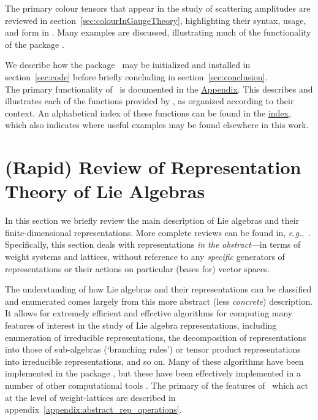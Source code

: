 \documentclass[12pt,a4paper]{article}\let\ifpdf\relax
\begin{document}
The primary colour tensors that appear in the study of scattering amplitudes are reviewed in \mbox{section~\ref{sec:colourInGaugeTheory}}, highlighting their syntax, usage, and form in \rpackage. Many examples are discussed, illustrating much of the functionality of the package \rpackage. 

We describe how the package \rpackage~may be initialized and installed in \mbox{section~\ref{sec:code}} before briefly concluding in \mbox{section~\ref{sec:conclusion}}.\\[-10pt]

The primary functionality of \rpackage~is documented in the \hyperlink{context_organization_of_appendix}{Appendix}. This describes and illustrates each of the functions provided by \rpackage, as organized according to their context. An alphabetical index of these functions can be found in the \hyperlink{index}{index}, which also indicates where useful examples may be found elsewhere in this work.





\newpage

\section{(Rapid) Review of Representation Theory of Lie Algebras}\label{review_section}\vspace{-4pt}

In this section we briefly review the main description of Lie algebras and their finite-dimensional representations. More complete reviews can be found in, \emph{e.g.},~\mbox{\cite{Slansky:1981yr,Cornwell:1997ke,DiFrancesco:1997nk,birdtracks,hamermesh2012group,fulton2013,georgi2018lie,Bourjaily:2025hvq}.} Specifically, this section deals with representations \emph{in the abstract}---in terms of weight systems and lattices, without reference to any \emph{specific} generators of representations or their actions on particular (bases for) vector spaces. 

The understanding of how Lie algebras and their representations can be classified and enumerated comes largely from this more abstract (less \emph{concrete}) description. It allows for extremely efficient and effective algorithms for computing many features of interest in the study of Lie algebra representations, including enumeration of irreducible representations, the decomposition of representations into those of sub-algebras (`branching rules') or tensor product representations into irreducible representations, and so on. Many of these algorithms have been implemented in the package \rpackage, but these have been effectively implemented in a number of other computational tools \cite{Feger:2019tvk,sage,magma}. The primary of the features of \rpackage~which act at the level of weight-lattices are described in \mbox{appendix~\ref{appendix:abstract_rep_operations}}. 
\end{document}
